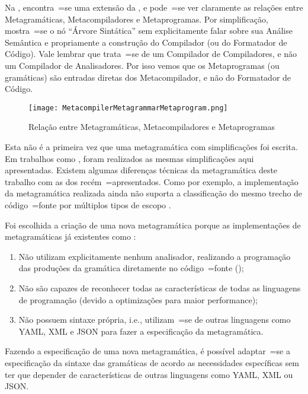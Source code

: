 Na ,
encontra~=se uma extensão da ,
e pode~=se ver claramente as relações entre Metagramáticas,
Metacompiladores e Metaprogramas. Por simplificação,
mostra~=se o nó ``Árvore Sintática'' sem explicitamente falar sobre sua Análise Semântica e
propriamente a construção do Compilador (ou do Formatador de Código).
Vale lembrar que trata~=se de um Compilador de Compiladores,
e não um Compilador de Analisadores.
Por isso vemos que os Metaprogramas (ou gramáticas) são entradas diretas dos Metacompilador,
e não do Formatador de Código.
\begin{figure}[!htb]
\caption{Relação entre Metagramáticas, Metacompiladores e Metaprogramas}
\label{MetacompilerMetagrammarMetaprogram}
\centering
\texttt{[image: MetacompilerMetagrammarMetaprogram.png]}
\end{figure}

Esta não é a primeira vez que uma metagramática com simplificações foi escrita.
Em trabalhos como ,
foram realizados as mesmas simplificações aqui apresentadas.
Existem algumas diferenças técnicas da metagramática deste trabalho com as dos recém~=apresentados.
Como por exemplo,
a implementação da metagramática realizada ainda não suporta a classificação do mesmo trecho de código~=fonte por múltiplos tipos de escopo \cite{vsCodeSyntaxHighlighthing}.

Foi escolhida a criação de uma nova metagramática porque as implementações de metagramáticas já existentes como :
\begin{enumerate}[1)]
\item Não utilizam explicitamente nenhum analisador,
realizando a programação das produções da gramática diretamente no código~=fonte ();
\item Não são capazes de reconhecer todas as características de todas as linguagens de programação (devido a optimizações para maior performance);
\item Não possuem sintaxe própria,
i.e.,
utilizam~=se de outras linguagens como YAML,
XML e
JSON para fazer a especificação da metagramática.
\end{enumerate}
Fazendo a especificação de uma nova metagramática,
é possível adaptar~=se a especificação da sintaxe das gramáticas de acordo as necessidades específicas sem ter que depender de características de outras linguagens como YAML,
XML ou
JSON.


